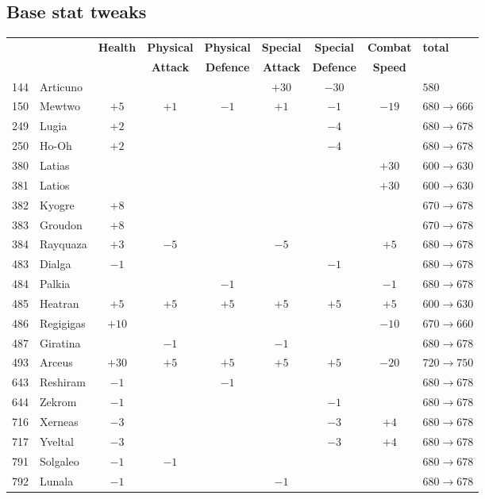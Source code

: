 \documentclass{article}
\begin{document}
\subsection{Base stat tweaks}
\small
\begin{longtable}{rl|cccccc|l}
 &  & \textbf{Health} & \textbf{Physical} & \textbf{Physical} & \textbf{Special} & \textbf{Special} & \textbf{Combat} & \textbf{total} \\
 &  &  & \textbf{Attack} & \textbf{Defence} & \textbf{Attack} & \textbf{Defence} & \textbf{Speed} &  \\
\hline
144 & Articuno &  &  &  & $+30$ & $-30$ &  & $580$ \\
150 & Mewtwo & $+5$ & $+1$ & $-1$ & $+1$ & $-1$ & $-19$ & $680 \rightarrow 666$ \\
\hline %
249 & Lugia & $+2$ &  &  &  & $-4$ &  & $680 \rightarrow 678$ \\
250 & Ho-Oh & $+2$ &  &  &  & $-4$ &  & $680 \rightarrow 678$ \\
\hline %
380 & Latias &  &  &  &  &  & $+30$ & $600 \rightarrow 630$ \\
381 & Latios &  &  &  &  &  & $+30$ & $600 \rightarrow 630$ \\
382 & Kyogre & $+8$ &  &  &  &  &  & $670 \rightarrow 678$ \\
383 & Groudon & $+8$ &  &  &  &  &  & $670 \rightarrow 678$ \\
384 & Rayquaza & $+3$ & $-5$ &  & $-5$ &  & $+5$ & $680 \rightarrow 678$ \\
\hline %
483 & Dialga & $-1$ &  &  &  & $-1$ &  & $680 \rightarrow 678$ \\
484 & Palkia &  &  & $-1$ &  &  & $-1$ & $680 \rightarrow 678$ \\
485 & Heatran & $+5$ & $+5$ & $+5$ & $+5$ & $+5$ & $+5$ & $600 \rightarrow 630$ \\
486 & Regigigas & $+10$ &  &  &  &  & $-10$ & $670 \rightarrow 660$ \\
487 & Giratina &  & $-1$ &  & $-1$ &  &  & $680 \rightarrow 678$ \\
493 & Arceus & $+30$ & $+5$ & $+5$ & $+5$ & $+5$ & $-20$ & $720 \rightarrow 750$ \\
\hline %
643 & Reshiram & $-1$ &  & $-1$ &  &  &  & $680 \rightarrow 678$ \\
644 & Zekrom & $-1$ &  &  &  & $-1$ &  & $680 \rightarrow 678$ \\
\hline %
716 & Xerneas & $-3$ &  &  &  & $-3$ & $+4$ & $680 \rightarrow 678$ \\
717 & Yveltal & $-3$ &  &  &  & $-3$ & $+4$ & $680 \rightarrow 678$ \\
\hline %
791 & Solgaleo & $-1$ & $-1$ &  &  &  &  & $680 \rightarrow 678$ \\
792 & Lunala & $-1$ &  &  & $-1$ &  &  & $680 \rightarrow 678$ \\
\hline %
\end{longtable}
\end{document}
